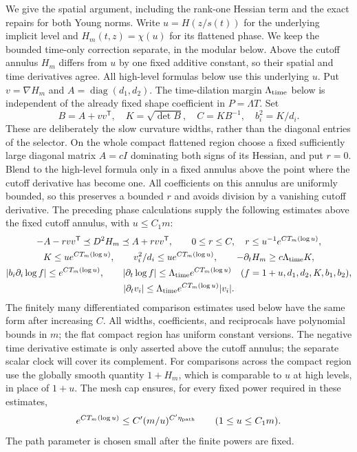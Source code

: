 \documentclass[11pt]{article}
\numberwithin{equation}{section}
\begin{document}
We give the spatial argument, including the rank-one Hessian term and
the exact repairs for both Young norms. Write $u=H(z/s(t))$ for the
underlying implicit level and $H_m(t,z)=\chi(u)$ for its flattened
phase. We keep the bounded time-only correction separate, in the
modular below. Above the cutoff annulus $H_m$ differs from $u$ by
one fixed additive constant, so their spatial and time derivatives
agree. All high-level formulas below use this underlying $u$.
Put $v=\nabla H_m$ and $A=\operatorname{diag}(d_1,d_2)$.
The time-dilation margin $\Lambda_{\rm time}$ below is independent
of the already fixed shape coefficient in $P=\Lambda T$.
Set
\[
 B=A+vv^{\mathsf T},\quad K=\sqrt{\det B},\quad
 C=KB^{-1},\quad b_i^2=K/d_i.
\]
These are deliberately the slow curvature widths, rather than the
diagonal entries of the selector. On the whole compact flattened
region choose a fixed sufficiently large diagonal matrix $A=cI$
dominating both signs of its Hessian, and put $r=0$. Blend to the
high-level formula only in a fixed annulus above the point where the
cutoff derivative has become one. All coefficients on this annulus
are uniformly bounded, so this preserves a bounded $r$ and avoids
division by a vanishing cutoff derivative.
The preceding phase calculations supply the following estimates above
the fixed cutoff annulus, with $u\le C_1m$:
\begin{gather}
 -A-rvv^{\mathsf T}\preceq D^2H_m\preceq A+rvv^{\mathsf T},
 \qquad 0\le r\le C,\quad r\le u^{-1}e^{CT_m(\log u)}, \label{pair:eq:engine-hessian}\\
 K\le ue^{CT_m(\log u)},\qquad v_i^2/d_i\le ue^{CT_m(\log u)},
 \qquad -\partial_tH_m\ge c\Lambda_{\rm time} K, \label{pair:eq:engine-phase}\\
 |b_i\partial_i\log f|\le e^{CT_m(\log u)},\qquad
 |\partial_t\log f|\le\Lambda_{\rm time} e^{CT_m(\log u)}
 \quad(f=1+u,d_1,d_2,K,b_1,b_2), \label{pair:eq:engine-scalar-derivatives}\\
 |\partial_t v_i|\le\Lambda_{\rm time} e^{CT_m(\log u)}|v_i|.
 \label{pair:eq:engine-time-gradient}
\end{gather}
The finitely many differentiated comparison estimates used below have
the same form after increasing $C$. All widths, coefficients, and
reciprocals have polynomial bounds in $m$; the flat compact region has
uniform constant versions. The negative time derivative estimate is
only asserted above the cutoff annulus; the separate scalar clock
will cover its complement. For comparisons across the compact region
use the globally smooth quantity $1+H_m$, which is comparable to $u$
at high levels, in place of $1+u$.
The mesh cap ensures, for every fixed
power required in these estimates,
\begin{equation}\label{pair:eq:engine-mesh-floor}
 e^{CT_m(\log u)}\le C'(m/u)^{C'\eta_{\rm path}}
 \qquad(1\le u\le C_1m).
\end{equation}
The path parameter is chosen small after the finite powers are fixed.
\end{document}

